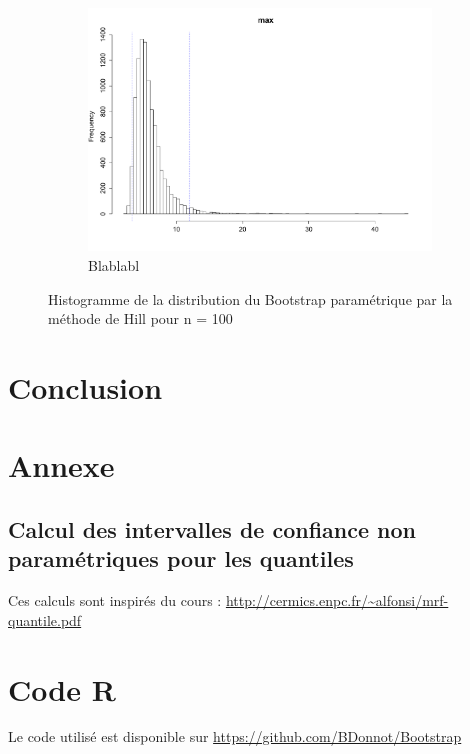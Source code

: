 \documentclass{article}
\renewcommand*{\(}{\left(}
\renewcommand*{\)}{\right)}
\begin{document}
\begin{figure}[H]
\begin{subfigure}[b]{0.3\textwidth}
        \includegraphics[width = \linewidth]{img/BootstrapParamHill-Max-100.pdf}
        \caption{Blablabl}
        \label{fig:BPHMax}
    \end{subfigure}%
    \caption{Histogramme de la distribution du Bootstrap paramétrique par la méthode de Hill pour n = 100}
    \label{fig:BPH}
\end{figure}







\section{Conclusion}



\section{Annexe}
\subsection{Calcul des intervalles de confiance non paramétriques pour les quantiles}
Ces calculs sont inspirés du cours :
\url{http://cermics.enpc.fr/~alfonsi/mrf-quantile.pdf}\\


\section{Code R}
Le code utilisé est disponible sur \url{https://github.com/BDonnot/Bootstrap}
\end{document}
